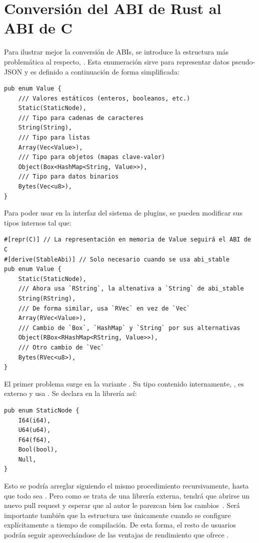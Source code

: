 
\chapter{Conversión del ABI de Rust al ABI de C}\label{annex:abi}

Para ilustrar mejor la conversión de ABIs, se introduce la estructura más
problemática al respecto, . Esta enumeración sirve para representar
datos pseudo-JSON y es definido a continuación de forma simplificada:

\begin{verbatim}
pub enum Value {
    /// Valores estáticos (enteros, booleanos, etc.)
    Static(StaticNode),
    /// Tipo para cadenas de caracteres
    String(String),
    /// Tipo para listas
    Array(Vec<Value>),
    /// Tipo para objetos (mapas clave-valor)
    Object(Box<HashMap<String, Value>>),
    /// Tipo para datos binarios
    Bytes(Vec<u8>),
}
\end{verbatim}

Para poder usar  en la interfaz del sistema de plugins, se pueden
modificar sus tipos internos tal que:

\begin{verbatim}
#[repr(C)] // La representación en memoria de Value seguirá el ABI de C
#[derive(StableAbi)] // Solo necesario cuando se usa abi_stable
pub enum Value {
    Static(StaticNode),
    /// Ahora usa `RString`, la altenativa a `String` de abi_stable
    String(RString),
    /// De forma similar, usa `RVec` en vez de `Vec`
    Array(RVec<Value>),
    /// Cambio de `Box`, `HashMap` y `String` por sus alternativas
    Object(RBox<RHashMap<RString, Value>>),
    /// Otro cambio de `Vec`
    Bytes(RVec<u8>),
}
\end{verbatim}

El primer problema surge en la variante . Su tipo contenido
internamente, , es externo y usa . Se
declara en la librería  así:

\begin{verbatim}
pub enum StaticNode {
    I64(i64),
    U64(u64),
    F64(f64),
    Bool(bool),
    Null,
}
\end{verbatim}

Esto se podría arreglar siguiendo el mismo procedimiento recursivamente, hasta
que todo sea \rust{#[repr(C)]}. Pero como se trata de una librería externa,
tendrá que abrirse un nuevo pull request y esperar que al autor le parezcan bien
los cambios~\cite{openstaticnode}. Será importante también que la estructura use
\rust{#[repr(C)]} únicamente cuando se configure explícitamente a tiempo de
compilación. De esta forma, el resto de usuarios podrán seguir aprovechándose de
las ventajas de rendimiento que ofrece .

